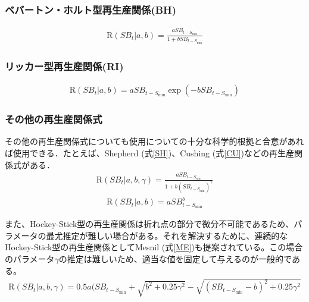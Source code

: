 \documentclass[11pt]{jsarticle}
\begin{document}
\subsubsection*{ベバートン・ホルト型再生産関係(BH)}
\begin{eqnarray}
  \mathrm{R}(S\!B_{t}|a,b)=\frac{a S\!B_{t-S_{\mathrm{min}}}}{1 + b S\!B_{t-S_{\mathrm{min}}}}
  \label{BH1}
\end{eqnarray}

\subsubsection*{リッカー型再生産関係(RI)}
\begin{eqnarray}
  \mathrm{R}(S\!B_{t}|a,b) = a S\!B_{t-S_{\mathrm{min}}}   \exp{(-b S\!B_{t-S_{\mathrm{min}}})}
  \label{RI1}
\end{eqnarray}


\subsubsection*{その他の再生産関係式\label{SRother}}
その他の再生産関係式についても使用についての十分な科学的根拠と合意があれば使用できる．たとえば、Shepherd (式\ref{SH})\cite{cushing}、Cushing (式\ref{CU})\cite{cushing}などの再生産関係式がある．
\begin{eqnarray}
  \mathrm{R}(S\!B_{t}|a,b,\gamma)=\frac{a S\!B_{t-S_{\mathrm{min}}}}{1 + b (S\!B_{t-S_{\mathrm{min}}})^\gamma}
  \label{SH}
\end{eqnarray}
\begin{eqnarray}
  \mathrm{R}(S\!B_{t}|a,b) = a S\!B_{t-S_{\mathrm{min}}}^b
  \label{CU}
\end{eqnarray}

また、Hockey-Stick型の再生産関係は折れ点の部分で微分不可能であるため、パラメータの最尤推定が難しい場合がある。それを解決するために、連続的なHockey-Stick型の再生産関係としてMesnil (式\ref{ME})\cite{mesnil}も提案されている。この場合のパラメータ$\gamma$の推定は難しいため、適当な値を固定して与えるのが一般的である。
\begin{eqnarray}
  \mathrm{R}(S\!B_{t}|a,b,\gamma) = 0.5 a (S\!B_{t-S_{\mathrm{min}}} + \sqrt{b^2+0.25\gamma^2}-\sqrt{(S\!B_{t-S_{\mathrm{min}}}-b)^2+0.25\gamma^2}
  \label{ME}
\end{eqnarray}
\end{document}
